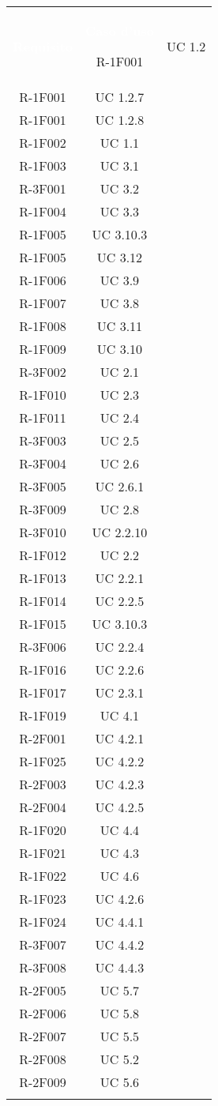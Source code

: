 \begin{tabularx}{\textwidth}{c|c}
	\rowcolor{greySWEight}
	\textcolor{white}{\textbf{Requisito}} &
	\textcolor{white}{\textbf{Caso d'uso}}\endhead

R-1F001 & UC 1.2 \\
R-1F001 & UC 1.2.7\\
R-1F001 & UC 1.2.8 \\
R-1F002 & UC 1.1 \\
R-1F003 & UC 3.1 \\
R-3F001 & UC 3.2 \\
R-1F004 & UC 3.3 \\
R-1F005 & UC 3.10.3 \\
R-1F005 & UC 3.12 \\
R-1F006 & UC 3.9 \\
R-1F007 & UC 3.8 \\
R-1F008 & UC 3.11 \\
R-1F009 & UC 3.10 \\
R-3F002 & UC 2.1 \\
R-1F010 & UC 2.3 \\
R-1F011 & UC 2.4 \\
R-3F003 & UC 2.5 \\
R-3F004 & UC 2.6 \\
R-3F005 & UC 2.6.1 \\
R-3F009 & UC 2.8\\
R-3F010 & UC 2.2.10\\
R-1F012 & UC 2.2 \\
R-1F013 & UC 2.2.1 \\
R-1F014 & UC 2.2.5 \\
R-1F015 & UC 3.10.3 \\
R-3F006 & UC 2.2.4 \\
R-1F016 & UC 2.2.6 \\
R-1F017 & UC 2.3.1 \\
R-1F019 & UC 4.1 \\
R-2F001 & UC 4.2.1 \\
R-1F025 & UC 4.2.2 \\
R-2F003 & UC 4.2.3 \\
R-2F004 & UC 4.2.5 \\
R-1F020 & UC 4.4 \\
R-1F021 & UC 4.3 \\
R-1F022 & UC 4.6 \\
R-1F023 & UC 4.2.6 \\
R-1F024 & UC 4.4.1 \\
R-3F007 & UC 4.4.2 \\
R-3F008 & UC 4.4.3 \\
R-2F005 & UC 5.7 \\
R-2F006 & UC 5.8 \\
R-2F007 & UC 5.5 \\
R-2F008 & UC 5.2 \\
R-2F009 & UC 5.6 \\

\caption{Tabella tracciamento requisiti-casi d'uso} \label{tab:tabellarequisiticasi}
\end{tabularx}
